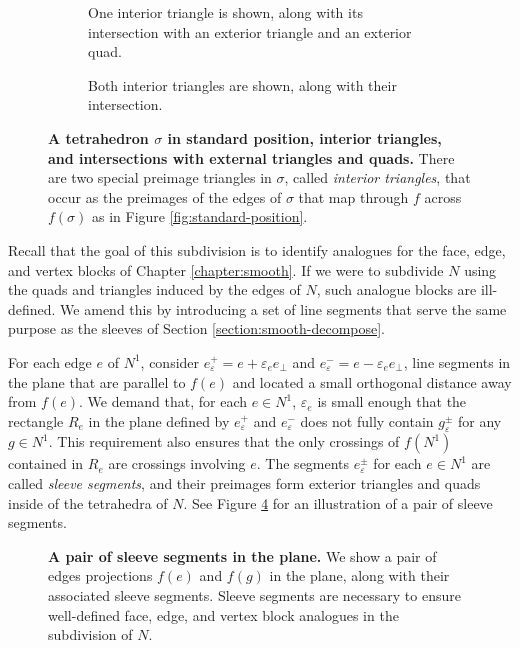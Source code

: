 \begin{figure}[h!]
	\begin{subfigure}[t]{0.45\textwidth}
		\caption{One interior triangle is shown, along with its intersection with an exterior triangle and an exterior quad.} \label{fig:standard-position-interior-exterior}
	\end{subfigure}
	\hfill
	\begin{subfigure}[t]{0.45\textwidth}
		\caption{Both interior triangles are shown, along with their intersection.} \label{fig:standard-position-interior-interior}
	\end{subfigure}
	
	\caption{
		\textbf{A tetrahedron $\sigma$ in standard position, interior triangles, and intersections with external triangles and quads.}
		There are two special preimage triangles in $\sigma$, called \emph{interior triangles}, that occur as the preimages of the edges of $\sigma$ that map through $f$ across $f(\sigma)$ as in Figure \ref{fig:standard-position}.
	}
	\label{fig:standard-position-interior}
\end{figure}

Recall that the goal of this subdivision is to identify analogues for the face, edge, and vertex blocks of Chapter \ref{chapter:smooth}.
If we were to subdivide $N$ using the quads and triangles induced by the edges of $N$, such analogue blocks are ill-defined.
We amend this by introducing a set of line segments that serve the same purpose as the sleeves of Section \ref{section:smooth-decompose}.

For each edge $e$ of $N^1$, consider $e_\varepsilon^+ = e+\varepsilon_e e_\perp$ and $e_\varepsilon^- =e-\varepsilon_e e_\perp$, line segments in the plane that are parallel to $f(e)$ and located a small orthogonal distance away from $f(e)$.
We demand that, for each $e\in N^1$, $\varepsilon_e$ is small enough that the rectangle $R_e$ in the plane defined by $e_\varepsilon^+$ and $e_\varepsilon^-$ does not fully contain $g_\varepsilon^\pm$ for any $g\in N^1$.
This requirement also ensures that the only crossings of $f(N^1)$ contained in $R_e$ are crossings involving $e$.
The segments $e_\varepsilon^\pm$ for each $e\in N^1$ are called \emph{sleeve segments}, and their preimages form exterior triangles and quads inside of the tetrahedra of $N$.
See Figure \ref{fig:pl-sleeves} for an illustration of a pair of sleeve segments.

\begin{figure}[h!]
	\caption{
		\textbf{A pair of sleeve segments in the plane.}
		We show a pair of edges projections $f(e)$ and $f(g)$ in the plane, along with their associated sleeve segments.
		Sleeve segments are necessary to ensure well-defined face, edge, and vertex block analogues in the subdivision of $N$.
	}
	\label{fig:pl-sleeves}
\end{figure}

